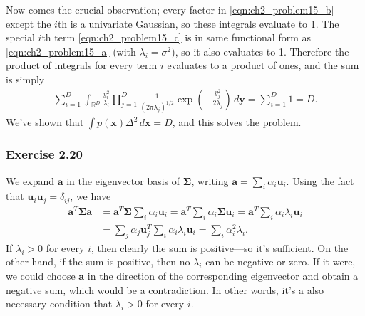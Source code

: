 \documentclass[12pt, a4paper]{article}
\newcommand{\R}{\mathbb{R}}
\newcommand{\vect}[1]{\bm{#1}}
\begin{document}
Now comes the crucial observation; every factor in \eqref{eqn:ch2_problem15_b} except the $i$th is a univariate Gaussian, so these integrals evaluate to 1.
The special $i$th term \eqref{eqn:ch2_problem15_c} is in same functional form as \eqref{eqn:ch2_problem15_a} (with $\lambda_i = \sigma^2$), so it also evaluates to 1.
Therefore the product of integrals for every term $i$ evaluates to a product of ones, and the sum is simply
\begin{align*}
\sum_{i=1}^{D} \int_{\R^D}  \frac{y_i^2}{\lambda_i} 
\prod_{j=1}^{D} \frac{1}{(2 \pi \lambda_j)^{1/2}} 
\exp \left( - \frac{y_j^2}{2 \lambda_j} \right)  \, d \vect{y}
=
\sum_{i=1}^{D} 1 = D.
\end{align*}
We've shown that $\int p(\vect{x}) \Delta^2 \, d\vect{x} = D$, and this solves the problem.

\subsubsection*{Exercise 2.20}
We expand $\vect{a}$ in the eigenvector basis of $\vect{\Sigma}$, writing $\vect{a} = \sum_i \alpha_i \vect{u}_i$.
Using the fact that $\vect{u}_i \vect{u}_j = \delta_{ij}$, we have
\begin{align*}
	\vect{a}^T \vect{\Sigma} \vect{a} 
	&= \vect{a}^T \vect{\Sigma} \sum_i \alpha_i \vect{u}_i
	= \vect{a}^T \sum_i \alpha_i \vect{\Sigma} \vect{u}_i
	= \vect{a}^T \sum_i \alpha_i \lambda_i \vect{u}_i \\
	&= \sum_j \alpha_j \vect{u}^T_j \sum_i \alpha_i \lambda_i \vect{u}_i
	= \sum_i \alpha_i^2 \lambda_i.
\end{align*}
If $\lambda_i > 0$ for every $i$, then clearly the sum is positive---so it's sufficient.
On the other hand, if the sum is positive, then no $\lambda_i$ can be negative or zero.
If it were, we could choose $\vect{a}$ in the direction of the corresponding eigenvector and obtain a negative sum, which would be a contradiction.
In other words, it's a also necessary condition that $\lambda_i > 0$ for every $i$.
\end{document}
